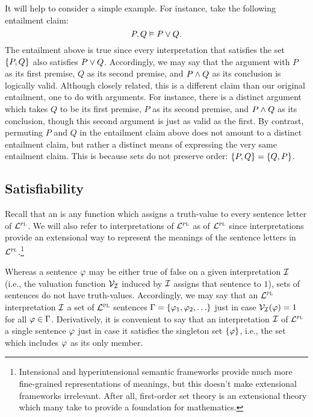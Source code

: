 It will help to consider a simple example.
For instance, take the following entailment claim: 
  $$P, Q \vDash P\vee Q.$$ 
The entailment above is true since every interpretation that satisfies the set $\lbrace P, Q\rbrace$ also satisfies $P\vee Q$.
Accordingly, we may say that the argument with $P$ as its first premise, $Q$ as its second premise, and $P\wedge Q$ as its conclusion is logically valid. 
Although closely related, this is a different claim than our original entailment, one to do with arguments.
For instance, there is a distinct argument which takes $Q$ to be its first premise, $P$ as its second premise, and $P\wedge Q$ as its conclusion, though this second argument is just as valid as the first.
By contrast, permuting $P$ and $Q$ in the entailment claim above does not amount to a distinct entailment claim, but rather a distinct means of expressing the very same entailment claim. 
This is because sets do not preserve order: $\lbrace P,Q\rbrace=\lbrace Q,P\rbrace$.




\subsection{Satisfiability}
\label{sub:PL-Satisfiability}


Recall that an  is any function which assigns a truth-value to every sentence letter of $\mathcal{L}^{\textsc{pl}}$.
We will also refer to interpretations of $\mathcal{L}^{\textsc{pl}}$ as  of $\mathcal{L}^{\textsc{pl}}$ since interpretations provide an extensional way to represent the meanings of the sentence letters in $\mathcal{L}^{\textsc{pl}}$.\footnote{Intensional and hyperintensional semantic frameworks provide much more fine-grained representations of meanings, but this doesn't make extensional frameworks irrelevant. After all, first-order set theory is an extensional theory which many take to provide a foundation for mathematics.}

Whereas a sentence $\varphi$ may be either true of false on a given interpretation $\mathcal{I}$ (i.e., the valuation function $\mathcal{V}_{\mathcal{I}}$ induced by $\mathcal{I}$ assigns that sentence to $1$), sets of sentences do not have truth-values.
Accordingly, we may say that an $\mathcal{L}^{\textsc{pl}}$ interpretation $\mathcal{I}$  a set of $\mathcal{L}^{\textsc{pl}}$ sentences $\Gamma=\lbrace\varphi_{1},\varphi_{2},\ldots\rbrace$ just in case $\mathcal{V}_{\mathcal{I}}(\varphi)=1$ for all $\varphi \in \Gamma$.
Derivatively, it is convenient to say that an interpretation $\mathcal{I}$ of $\mathcal{L}^{\textsc{pl}}$  a single sentence $\varphi$ just in case it satisfies the singleton set $\lbrace\varphi\rbrace$, i.e., the set which includes $\varphi$ as its only member. 

